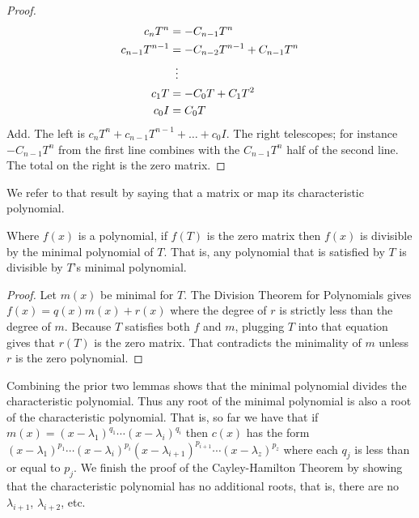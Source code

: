 \begin{proof}
\begin{align*}
  c_nT^n
  &=-C_{n-1}T^n    \\
  c_{n-1}T^{n-1}
  &=-C_{n-2}T^{n-1}+C_{n-1}T^n    \\
  &\vdotswithin{=}             \\
  c_{1}T
  &=-C_{0}T+C_{1}T^2    \\
  c_{0}I
  &=C_{0}T
\end{align*}
Add.
The left is 
\( c_nT^n+c_{n-1}T^{n-1}+\dots+c_0I \). 
The right telescopes;
for instance $-C_{n-1}T^n$ from the first line combines with the 
$C_{n-1}T^n$ half of the second line. 
The total on the right is the zero matrix.
\end{proof}

We refer to that result by saying that a
matrix or map 
its characteristic polynomial.

\begin{lemma} \label{le:tSatisImpMinPolyDivides}
Where \( f(x) \) is a polynomial, if \( f(T) \) is the zero matrix 
then \( f(x) \) is divisible by the minimal polynomial of \( T \).
That is, any polynomial that is satisfied by \( T \) is divisible by
\( T \)'s minimal polynomial.
\end{lemma}

\begin{proof}
Let \( m(x) \) be minimal for \( T \).
The Division Theorem for Polynomials gives
\( f(x)=q(x)m(x)+r(x) \)
where the degree of \( r \) is strictly less than the degree of \( m \).
Because $T$ satisfies both $f$ and $m$, plugging $T$ into that equation gives
that \( r(T) \) is the zero matrix.
That contradicts the minimality of \( m \) unless \( r \)
is the zero polynomial.
\end{proof}

Combining the prior two lemmas shows that the minimal polynomial 
divides the characteristic polynomial. 
Thus
any root of the minimal polynomial is also a root of the characteristic
polynomial. 
That is, so far we have that if 
\( m(x)=(x-\lambda_1)^{q_1}\cdots(x-\lambda_i)^{q_i} \) then
\( c(x) \) has the form
\( (x-\lambda_1)^{p_1}\cdots(x-\lambda_i)^{p_i}
     (x-\lambda_{i+1})^{p_{i+1}}\cdots(x-\lambda_z)^{p_z} \) where
each \( q_j \) is less than or equal to \( p_j \).
We finish the proof of the Cayley-Hamilton Theorem by showing that 
the characteristic polynomial has no additional roots, that is,
there are no $\lambda_{i+1}$, $\lambda_{i+2}$, etc.

